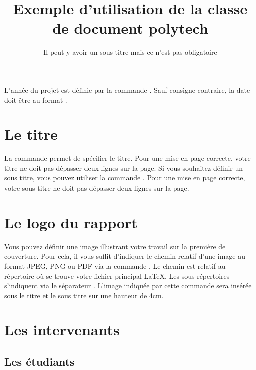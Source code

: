 \documentclass[overfullbox,hideweeklyreports,noseparatecontributorspage,nodate]{polytech}
\begin{document}
L'année du projet est définie par la commande . Sauf consigne contraire, la date doit être au format .
\begin{latexsource}
\end{latexsource}

\section{Le titre}

La commande  permet de spécifier le titre. Pour une mise en page correcte, votre titre ne doit pas dépasser deux lignes sur la page. Si vous souhaitez définir un sous titre, vous pouvez utiliser la commande . Pour une mise en page correcte, votre sous titre ne doit pas dépasser deux lignes sur la page.

\begin{latexsource}
\title{Exemple d'utilisation de la classe de document polytech}
\subtitle{Il peut y avoir un sous titre mais ce n'est pas obligatoire}
\end{latexsource}

\section{Le logo du rapport}

Vous pouvez définir une image illustrant votre travail sur la première de couverture. Pour cela, il vous suffit d'indiquer le chemin relatif d'une image au format JPEG, PNG ou PDF via la commande . Le chemin est relatif au répertoire où se trouve votre fichier principal \LaTeX. Les sous répertoires s'indiquent via le séparateur \latexcode{/}. L'image indiquée par cette commande sera insérée sous le titre et le sous titre sur une hauteur de 4cm.

\begin{latexsource}
\end{latexsource}

\section{Les intervenants}

\subsection{Les étudiants}
\end{document}
